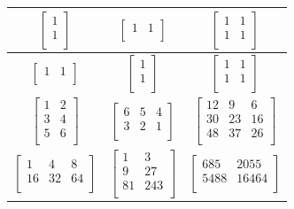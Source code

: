 \documentclass[a4paper,14pt]{report}
\begin{document}
\begin{table}[h]
\begin{tabular}{|c | c | c |}
		$\begin{bmatrix}
		1 \\
		1 \\
		\end{bmatrix}$ &
		$\begin{bmatrix}
		1 & 1 \\
		\end{bmatrix}$ &
		$\begin{bmatrix}
		1 & 1 \\
		1 & 1 \\
		\end{bmatrix}$ \\
		\hline

		$\begin{bmatrix}
		1 & 1\\
		\end{bmatrix}$ &
		$\begin{bmatrix}
		1 \\
		1 \\
		\end{bmatrix}$ &
		$\begin{bmatrix}
		1 & 1 \\
		1 & 1 \\
		\end{bmatrix}$ \\
		\hline

		$\begin{bmatrix}
		1 & 2 \\
		3 & 4 \\
		5 & 6 \\
		\end{bmatrix}$ &
		$\begin{bmatrix}
		6 & 5 & 4 \\
		3 & 2 & 1\\
		\end{bmatrix}$ &
		$\begin{bmatrix}
		12 & 9 & 6 \\
		30 & 23 & 16 \\
		48 & 37 & 26 \\
		\end{bmatrix}$ \\
		\hline

		$\begin{bmatrix}
		1 & 4 & 8 \\
		16 & 32 & 64 \\
		\end{bmatrix}$ &
		$\begin{bmatrix}
		1 & 3 \\
		9 & 27 \\
		81 & 243 \\
		\end{bmatrix}$ &
		$\begin{bmatrix}
		685 & 2055 \\
		5488 & 16464 \\
		\end{bmatrix}$ \\
		\hline


\end{tabular}
\end{table}
\end{document}
